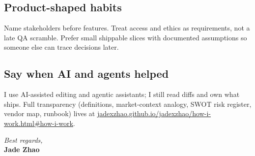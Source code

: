 \documentclass[11pt]{article}
\begin{document}
\subsection*{Product-shaped habits}
Name stakeholders before features. Treat access and ethics as requirements, not a late QA scramble. Prefer small shippable slices with documented assumptions so someone else can trace decisions later.

\subsection*{Say when AI and agents helped}
I use AI-assisted editing and agentic assistants; I still read diffs and own what ships. Full transparency (definitions, market-context analogy, SWOT risk register, vendor map, runbook) lives at \href{https://jadexzhao.github.io/jadexzhao/how-i-work.html\#how-i-work}{jadexzhao.github.io/jadexzhao/how-i-work.html\#how-i-work}.

\vspace{1em}
\noindent\textit{Best regards,}\\
\textbf{Jade Zhao}
\end{document}

